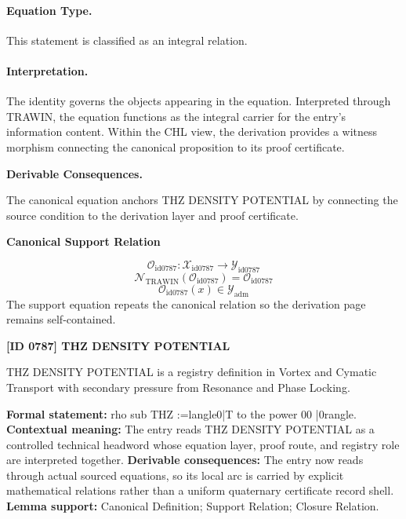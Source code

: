 \paragraph{Equation Type.}
This statement is classified as an integral relation.

\paragraph{Interpretation.}
The identity governs the objects appearing in the equation. Interpreted through TRAWIN, the equation functions as the integral carrier for the entry’s information content. Within the CHL view, the derivation provides a witness morphism connecting the canonical proposition to its proof certificate.

\par\vspace{0.35em}
\noindent\textbf{Derivable Consequences.}\quad
\begingroup
\footnotesize
\raggedright
The canonical equation anchors THZ DENSITY POTENTIAL by connecting the source condition to the derivation layer and proof certificate.
\par\endgroup

\noindent\textbf{Canonical Support Relation}\par
\[
\mathcal{O}_{\mathrm{id0787}}:\mathcal{X}_{\mathrm{id0787}}\longrightarrow\mathcal{Y}_{\mathrm{id0787}}
\]
\[
\mathcal{N}_{\mathrm{TRAWIN}}(\mathcal{O}_{\mathrm{id0787}})=\mathcal{O}_{\mathrm{id0787}}
\]
\[
\mathcal{O}_{\mathrm{id0787}}(x)\in\mathcal{Y}_{\mathrm{adm}}
\]
\noindent The support equation repeats the canonical relation so the derivation page remains self-contained.\par

\clearpage
\noindent\textbf{[ID 0787] THZ DENSITY POTENTIAL}\par
\vspace{0.35em}
\begingroup\small
{}
THZ DENSITY POTENTIAL is a registry definition in Vortex and Cymatic Transport with secondary pressure from Resonance and Phase Locking.

\begingroup\footnotesize\setlength{\emergencystretch}{3em}\sloppy
\textbf{Formal statement:} rho sub THZ :=langle0|T to the power 00 |0rangle. \textbf{Contextual meaning:} The entry reads THZ DENSITY POTENTIAL as a controlled technical headword whose equation layer, proof route, and registry role are interpreted together. \textbf{Derivable consequences:} The entry now reads through actual sourced equations, so its local arc is carried by explicit mathematical relations rather than a uniform quaternary certificate record shell. \textbf{Lemma support:} Canonical Definition; Support Relation; Closure Relation.\par
\endgroup

